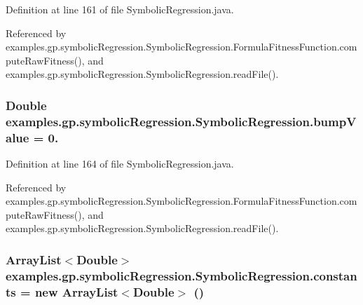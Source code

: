 Definition at line 161 of file Symbolic\-Regression.\-java.



Referenced by examples.\-gp.\-symbolic\-Regression.\-Symbolic\-Regression.\-Formula\-Fitness\-Function.\-compute\-Raw\-Fitness(), and examples.\-gp.\-symbolic\-Regression.\-Symbolic\-Regression.\-read\-File().

\hypertarget{classexamples_1_1gp_1_1symbolic_regression_1_1_symbolic_regression_adaa96c1e44db3faf9afaf2f689bd3269}{
\subsubsection[{bump\-Value}]{\setlength{\rightskip}{0pt plus 5cm}Double examples.\-gp.\-symbolic\-Regression.\-Symbolic\-Regression.\-bump\-Value = 0.\hspace{0.3cm}{\ttfamily [static]}}}\label{classexamples_1_1gp_1_1symbolic_regression_1_1_symbolic_regression_adaa96c1e44db3faf9afaf2f689bd3269}


Definition at line 164 of file Symbolic\-Regression.\-java.



Referenced by examples.\-gp.\-symbolic\-Regression.\-Symbolic\-Regression.\-Formula\-Fitness\-Function.\-compute\-Raw\-Fitness(), and examples.\-gp.\-symbolic\-Regression.\-Symbolic\-Regression.\-read\-File().

\hypertarget{classexamples_1_1gp_1_1symbolic_regression_1_1_symbolic_regression_acb3e678854ed359a070db483c5b22cbf}{
\subsubsection[{constants}]{\setlength{\rightskip}{0pt plus 5cm}Array\-List$<$Double$>$ examples.\-gp.\-symbolic\-Regression.\-Symbolic\-Regression.\-constants = new Array\-List$<$Double$>$ ()\hspace{0.3cm}{\ttfamily [static]}}}\label{classexamples_1_1gp_1_1symbolic_regression_1_1_symbolic_regression_acb3e678854ed359a070db483c5b22cbf}


